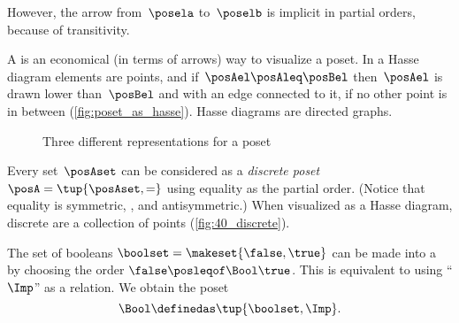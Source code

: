 However, the arrow from~$\posela$ to~$\poselb$ is implicit in partial orders, because of transitivity.

A \emph{} is an economical (in terms of arrows) way to visualize a poset.
In a Hasse diagram elements are points, and if~$\posAel \posAleq \posBel$ then~$\posAel$ is drawn lower than~$\posBel$ and with an edge connected to it, if no other point is in between (\cref{fig:poset_as_hasse}).
Hasse diagrams are directed graphs.

\begin{figure*}[h!]
    \hspace{4em}
    \hspace{4em}
    \hspace{4em}
    \caption{Three different representations for a poset}
    \label{fig:poset_representation}
\end{figure*}

\hfill

\begin{marginfigure}
    \centering
    \caption{}
    \label{fig:40_discrete}
\end{marginfigure}

\begin{example}
    \label{ex:discreteposet}
    Every set~$\posAset$ can be considered as a \emph{discrete poset}~$\posA = \tup{\posAset,=}$ using equality as the partial order.
    (Notice that equality is symmetric, , and antisymmetric.)
    When visualized as a Hasse diagram, discrete  are a collection of points (\cref{fig:40_discrete}).
\end{example}

\begin{marginfigure}
    \centering
    \caption{}
\end{marginfigure}

\begin{definition}
    \label{def:bool-poset}
    The set of booleans $\boolset = \makeset{\false, \true}$ can be made into a  by choosing the order $\false \posleqof\Bool \true$.
    This is equivalent to using ``$\Imp$'' as a relation.
    We obtain the poset
    \begin{equation}
        \label{eq:bool-poset}
        \Bool \definedas \tup{\boolset, \Imp}.
    \end{equation}
\end{definition}

